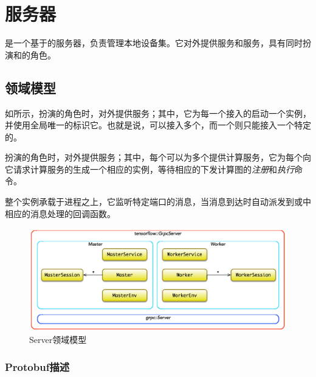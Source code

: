 \section{服务器}

\begin{content}

是一个基于的服务器，负责管理本地设备集。它对外提供服务和服务，具有同时扮演和的角色。

\subsection{领域模型}

如所示，扮演的角色时，对外提供服务；其中，它为每一个接入的启动一个实例，并使用全局唯一的标识它。也就是说，可以接入多个，而一个则只能接入一个特定的。

扮演的角色时，对外提供服务；其中，每个可以为多个提供计算服务，它为每个向它请求计算服务的生成一个相应的实例，等待相应的下发计算图的\emph{注册}和\emph{执行}命令。

整个实例承载于进程之上，它监听特定端口的消息，当消息到达时自动派发到或中相应的消息处理的回调函数。

\begin{figure}[H]
\centering
\includegraphics[width=1.0\textwidth]{figures/cc-server-model.png}
\caption{Server领域模型}
 \label{fig:cc-server-model}
\end{figure}

\subsubsection{Protobuf描述}


\end{content}
